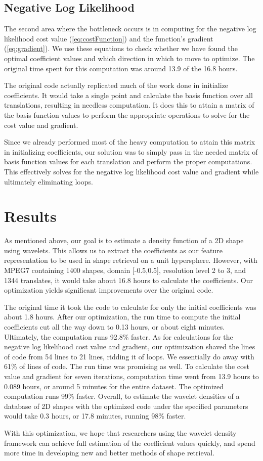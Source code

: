 \documentclass[../tech_report_1.tex]{subfiles}
\begin{document}
\subsection*{Negative Log Likelihood}

The second area where the bottleneck occurs is in computing for the
negative log likelihood cost value (\ref{eq:costFunction}) and the
function's gradient (\ref{eq:gradient}). We use these equations to
check whether we have found the  optimal coefficient values and
which direction in which to move to optimize. The original time spent for this
computation was around 13.9 of the 16.8 hours. 

The original code actually replicated much of the work done in initialize coefficients. It would take a single point and calculate the basis
function over all translations, resulting in needless computation.
It does this to attain a matrix of the basis function values to perform
the appropriate operations to solve for the cost value and gradient. 

Since we already performed most of the heavy computation to attain
this matrix in initializing coefficients, our solution was to simply
pass in the needed matrix of basis function values for each translation
and perform the proper computations. This effectively solves for the
negative log likelihood cost value and gradient while ultimately eliminating
loops. 

\section*{Results}

As mentioned above, our goal is to estimate a density function of
a 2D shape using wavelets. This allows us to extract the coefficients
as our feature representation to be used in shape retrieval on a unit
hypersphere. However, with MPEG7 containing 1400 shapes, domain {[}-0.5,0.5{]},
resolution level 2 to 3, and 1344 translates, it would take about 16.8
hours to calculate the coefficients. Our optimization yields significant improvements over the original code.

The original time it took the code to calculate for only the initial
coefficients was about 1.8 hours. After our optimization, the run
time to compute the initial coefficients cut all the way down to 0.13
hours, or about eight minutes. Ultimately, the computation runs 92.8\%
faster. As for calculations for the negative log likelihood cost value
and gradient, our optimization shaved the lines of code from 54 lines
to 21 lines, ridding it of loops. We essentially do away with 61\%
of lines of code. The run time was promising as well. To calculate
the cost value and gradient for seven iterations, computation time
went from 13.9 hours to 0.089 hours, or around 5 minutes for the entire
dataset. The optimized computation runs 99\% faster. Overall, to estimate
the wavelet densities of a database of 2D shapes with the optimized
code under the specified parameters would take 0.3 hours, or 17.8
minutes, running 98\% faster.

With this optimization, we hope that researchers using the wavelet density framework can achieve full estimation of the coefficient values quickly, and spend more
time in developing new and better methods of shape retrieval.
\end{document}
